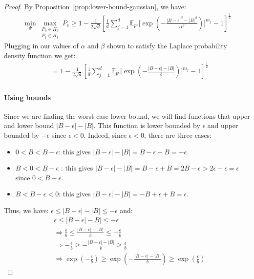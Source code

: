 \begin{proof}
    By Proposition~\ref{prop:lower-bound-gaussian}, we have:
\begin{align*}
    \min _{\Psi} 
    \max _{\substack{P_0 \in H_0 \\ P_1 \in H_1}} P_e \geq 1 - \frac{1}{2\sqrt{d}}\left[
             \frac{1}{d}
            \sum_{j=1}^d \mathbb{E}_{p^\epsilon}\Bigg[
            \exp\left(-
            \frac{|B - \epsilon|^\beta-|B|^\beta}{\alpha^\beta}
            \right)\Bigg]^{m_j}
            -1
            \right]^{\frac{1}{2}}
\end{align*}
Plugging in our values of $\alpha$ and $\beta$ shown to satisfy the Laplace probability density function we get:
    \begin{align*}
    &= 1 - \frac{1}{2\sqrt{d}}\left[
             \frac{1}{d}
            \sum_{j=1}^d \mathbb{E}_{p^\epsilon}\Bigg[
            \exp\left(-
            \frac{|B - \epsilon|-|B|}{b}
            \right)\Bigg]^{m_j}
            -1
            \right]^{\frac{1}{2}}\\
    \end{align*}
\paragraph{Using bounds} Since we are finding the worst case lower bound, we will find functions that upper and lower bound $|B - \epsilon| - |B|$. This function is lower bounded by $\epsilon$ and upper bounded by $-\epsilon$ since $\epsilon < 0$. Indeed, since $\epsilon < 0$, there are three cases: 
\begin{itemize}
    \item $0 < B < B - \epsilon$: this gives $|B - \epsilon| - |B|=  B - \epsilon - B = -\epsilon$
    \item $B < 0 < B - \epsilon$ : this gives $|B - \epsilon| - |B|=  B - \epsilon + B = 2 B -\epsilon > 2 \epsilon - \epsilon = \epsilon$ since $0 < B - \epsilon$.
    \item $  B < B - \epsilon < 0$: this gives $|B - \epsilon| - |B|=-B + \epsilon + B =  \epsilon$.
\end{itemize}
Thus, we have:
$ \epsilon \leq |B - \epsilon| - |B| \leq -\epsilon$ 
and:
\begin{align*}
    &
    \epsilon 
    \leq 
    |B - \epsilon| - B| 
    \leq 
    -\epsilon\\
    & \Rightarrow 
    \frac{\epsilon}{b} 
    \leq 
   \frac{|B - \epsilon|-|B|}{b}
    \leq 
    -\frac{\epsilon}{b}\\
    & \Rightarrow 
    -\frac{\epsilon}{b} 
    \geq 
   -\frac{|B - \epsilon|-|B|}{b}
    \geq 
    \frac{\epsilon}{b}\\
    & \Rightarrow 
    \exp\left(-\frac{\epsilon}{b} \right) 
    \geq 
   \exp\left(-\frac{|B - \epsilon|-|B|}{b}\right) 
    \geq 
    \exp\left(\frac{\epsilon}{b}\right)
\end{align*}


\end{proof}

